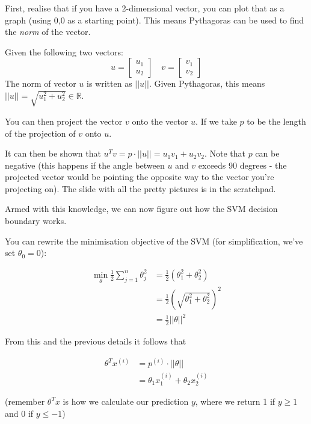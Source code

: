 First, realise that if you have a 2-dimensional vector, you can plot that as a graph (using 0,0 as a starting point). This means Pythagoras can be used to find the \emph{norm} of the vector.

Given the following two vectors:
\begin{equation}
u = \left[ \begin{array}{c} u_1 \\ u_2 \end{array} \right]
\quad
v = \left[ \begin{array}{c} v_1 \\ v_2 \end{array} \right]
\end{equation}
The norm of vector $u$ is written as $||u||$. Given Pythagoras, this means $||u|| = \sqrt{u_1^2 + u_2^2} \in \mathbb{R}$.

You can then project the vector $v$ onto the vector $u$. If we take $p$ to be the length of the projection of $v$ onto $u$.

It can then be shown that $u^Tv = p \cdot ||u|| = u_1v_1 + u_2v_2$. Note that $p$ can  be negative (this happens if the angle between $u$ and $v$ exceeds 90 degrees - the projected vector would be pointing the opposite way to the vector you're projecting on). The slide with all the pretty pictures is in the scratchpad.

Armed with this knowledge, we can now figure out how the SVM decision boundary works.

You can rewrite the minimisation objective of the SVM (for simplification, we've set $\theta_0 = 0$):

\begin{align*} 
\min_\theta \frac{1}{2}\sum^n_{j=1}\theta^2_j
&= \frac{1}{2}(\theta_1^2 + \theta_2^2) \\
&= \frac{1}{2}(\sqrt{\theta_1^2 + \theta_2^2})^2 \\
&= \frac{1}{2}||\theta||^2
\end{align*}

From this and the previous details it follows that

\begin{align*} 
\theta^Tx^{(i)} &= p^{(i)} \cdot ||\theta|| \\
&= \theta_1x_1^{(i)} + \theta_2x_2^{(i)}
\end{align*}

(remember $\theta^Tx$ is how we calculate our prediction $y$, where we return 1 if $y \geq 1$ and 0 if $y \leq -1$)

